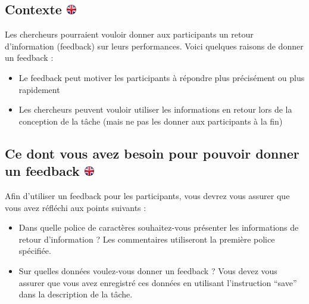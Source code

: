 \documentclass[
]{book}
\providecommand{\tightlist}{%
  \setlength{\itemsep}{0pt}\setlength{\parskip}{0pt}}
\begin{document}
\hypertarget{contexte-ukflag}{%
\subsection[Contexte ]{\texorpdfstring{Contexte
\href{https://www.psytoolkit.org/doc3.1.0/feedback.html\#_background}{\protect\includegraphics{img/ukflag.png}}}{Contexte ukflag}}\label{contexte-ukflag}}

Les chercheurs pourraient vouloir donner aux participants un retour
d'information (feedback) sur leurs performances. Voici quelques raisons
de donner un feedback :

\begin{itemize}
\tightlist
\item
  Le feedback peut motiver les participants à répondre plus précisément
  ou plus rapidement
\item
  Les chercheurs peuvent vouloir utiliser les informations en retour
  lors de la conception de la tâche (mais ne pas les donner aux
  participants à la fin)
\end{itemize}

\hypertarget{ce-dont-vous-avez-besoin-pour-pouvoir-donner-un-feedback-ukflag}{%
\subsection[Ce dont vous avez besoin pour pouvoir donner un feedback
]{\texorpdfstring{Ce dont vous avez besoin pour pouvoir donner un
feedback
\href{https://www.psytoolkit.org/doc3.1.0/feedback.html\#_what_you_need_to_be_able_to_give_feedback}{\protect\includegraphics{img/ukflag.png}}}{Ce dont vous avez besoin pour pouvoir donner un feedback ukflag}}\label{ce-dont-vous-avez-besoin-pour-pouvoir-donner-un-feedback-ukflag}}

Afin d'utiliser un feedback pour les participants, vous devrez vous
assurer que vous avez réfléchi aux points suivants :

\begin{itemize}
\tightlist
\item
  Dans quelle police de caractères souhaitez-vous présenter les
  informations de retour d'information ? Les commentaires utiliseront la
  première police spécifiée.
\item
  Sur quelles données voulez-vous donner un feedback ? Vous devez vous
  assurer que vous avez enregistré ces données en utilisant
  l'instruction ``save'' dans la description de la tâche.
\end{itemize}
\end{document}
